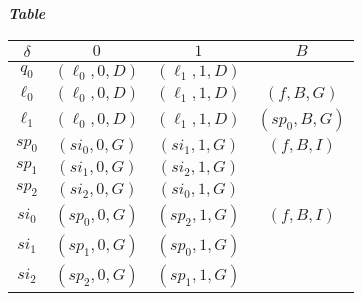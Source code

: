 \begin{center}
	\emph{\bfseries Table }
	
	\smallskip
	\begin{tabular}{|c||c|c|c|}
		\hline
		$\delta$ 
			& $0$ 
			& $1$
			& $B$ \\
		\hline
		\hline
		$q_0$ 
			& $(\ell_0 , 0, D)$ 
			& $(\ell_1 , 1, D)$
			&  \\
		\hline
		$\ell_0$
			& $(\ell_0 , 0 , D)$
			& $(\ell_1 , 1 , D)$
			& $(f      , B , G)$ \\
		\hline
		$\ell_1$
			& $(\ell_0 , 0 , D)$
			& $(\ell_1 , 1 , D)$
			& $(sp_0   , B , G)$ \\
		\hline
		\hline
		$sp_0$ 
			& $(si_0 , 0, G)$ 
			& $(si_1 , 1, G)$
			& $(f    , B, I)$ \\
		\hline
		$sp_1$ 
			& $(si_1 , 0, G)$ 
			& $(si_2 , 1, G)$
			&                 \\
		\hline
		$sp_2$ 
			& $(si_2 , 0, G)$ 
			& $(si_0 , 1, G)$
			&                 \\
		\hline
		\hline
		$si_0$ 
			& $(sp_0 , 0, G)$ 
			& $(sp_2 , 1, G)$
			& $(f    , B, I)$ \\
		\hline
		$si_1$ 
			& $(sp_1 , 0, G)$ 
			& $(sp_0 , 1, G)$
			&                 \\
		\hline
		$si_2$ 
			& $(sp_2 , 0, G)$ 
			& $(sp_1 , 1, G)$
			&                 \\
		\hline
	\end{tabular}
\end{center}




\newpage



